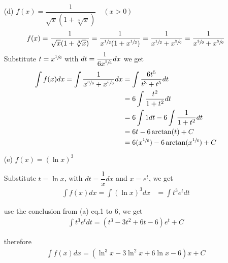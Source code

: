 \documentclass[11pt,a4paper]{article}
\renewcommand{\frac}{\dfrac}
\begin{document}
\begin{enumerate}
\item[(d)]$f(x)=\frac{1}{\sqrt{x}(1+\sqrt[3]{x})} \hspace{1em} (x>0)$
\begin{align}
f(x)
=\frac{1}{\sqrt{x}(1+\sqrt[3]{x})}
=\frac{1}{x^{\sfrac{1}{2}}(1+x^{\sfrac{1}{3}})}
=\frac{1}{x^{\sfrac{1}{2}}+x^{\sfrac{5}{6}}}
=\frac{1}{x^{\sfrac{3}{6}}+x^{\sfrac{5}{6}}}
\end{align}
Substitute $t=x^{\sfrac{1}{6}}$ with $dt=\frac{1}{6x^{\sfrac{5}{6}}}dx$ we get
\begin{align}
\int f(x)dx=\int\frac{1}{x^{\sfrac{3}{6}}+x^{\sfrac{5}{6}}}dx
&=\int\frac{6t^5}{t^3+t^5}dt \\
&=6\int\frac{t^2}{1+t^2}dt \\
&=6\int 1dt-6\int\frac{1}{1+t^2}dt \\
&=6t-6\arctan(t)+C \\
&=6(x^{\sfrac{1}{6}})-6\arctan(x^{\sfrac{1}{6}})+C
\end{align}

\item[(e)]$f(x)=(\ln x)^3$

Substitute $t=\ln x$, with $dt=\frac{1}{x}dx$ and $x=e^t$, we get
\begin{align}
\int f(x)dx=\int (\ln x)^3 dx
&=\int t^3 e^t dt
\end{align}

use the conclusion from (a) eq.1 to 6, we get
\begin{align}
\int t^3 e^t dt=(t^3-3t^2+6t-6)e^t+C
\end{align}

therefore
\begin{align}
\int f(x)dx=(\ln^3 x-3\ln^2 x+6\ln x-6)x+C
\end{align}

\end{enumerate}
\end{document}
